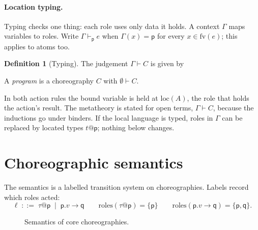 \documentclass[11pt]{report}
\makeatletter
\theoremstyle{plain}
\theoremstyle{definition}
\newtheorem{definition}[theorem]{Definition}
\theoremstyle{remark}
\newcommand{\kw}[1]{\mathsf{#1}}
\newcommand{\pp}{\mathsf{p}}
\newcommand{\qq}{\mathsf{q}}
\newcommand{\fv}{\mathrm{fv}}
\newcommand{\bind}[3]{#1 \leftarrow #2\,;\;#3}
\newcommand{\cret}[1]{\kw{ret}\;#1}
\newcommand{\com}[3]{#1.#2 \to #3}
\newcommand{\roles}[1]{\mathrm{roles}(#1)}
\newcommand{\loc}[1]{\mathrm{loc}(#1)}
\newcommand{\tauat}[1]{\tau\mathord{@}#1}
\newcommand{\lto}[1]{\xrightarrow{\;#1\;}}
\newcommand{\rn}[1]{{\normalfont\scshape #1}}
\makeatother
\begin{document}
\paragraph{Location typing.}
Typing checks one thing: each role uses only data it holds.  A context
$\Gamma$ maps variables to roles.  Write $\Gamma\vdash_\pp e$ when $\Gamma(x)=\pp$
for every $x\in\fv(e)$; this applies to atoms too.

\begin{definition}[Typing]\label{def:c1-typing}
  The judgement $\Gamma\vdash C$ is given by
  A \emph{program} is a choreography $C$ with $\emptyset\vdash C$.
\end{definition}

In both action rules the bound variable is held at $\loc{A}$, the role that
holds the action's result.  The metatheory is stated for open terms,
$\Gamma\vdash C$, because the inductions go under binders.  If the local
language is typed, roles in $\Gamma$ can be replaced by located types
$t\mathord{@}\pp$; nothing below changes.

\section{Choreographic semantics}
\label{sec:c1-sem}

The semantics is a labelled transition system on choreographies.  Labels
record which roles acted:
\[
  \ell \;::=\; \tauat{\pp} \;\mid\; \com{\pp}{v}{\qq}
  \qquad
  \roles{\tauat{\pp}} = \{\pp\}
  \qquad
  \roles{\com{\pp}{v}{\qq}} = \{\pp,\qq\}.
\]

\begin{figure}[t]
\caption{Semantics of core choreographies.}
\label{fig:c1-sem}
\end{figure}
\end{document}
